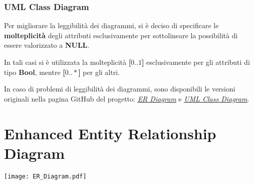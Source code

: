 \subsubsection{UML Class Diagram}

Per migliorare la leggibilità dei diagrammi, si è deciso di specificare le \textbf{molteplicità} degli attributi esclusivamente per sottolineare la possibilità di essere valorizzato a \textbf{NULL}. 

In tali casi si è utilizzata la molteplicità \textbf{[\(0..1\)]} esclusivamente per gli attributi di tipo \textbf{Bool}, mentre \textbf{[\(0..*\)]} per gli altri.

\bigskip

\begin{note}
  In caso di problemi di leggibilità dei diagrammi, sono disponibili le versioni originali nella pagina GitHub del progetto: \href{https://github.com/RiccardoElena/UninaDelivery/blob/develop/db/docs/sources/ER_Diagram.pdf}{\textit{\underline{ER Diagram}}} e \href{https://github.com/RiccardoElena/UninaDelivery/blob/develop/db/docs/sources/UML_Class_Diagram.pdf}{\textit{\underline{UML Class Diagram}}}.
\end{note}

\newpage
\section{Enhanced Entity Relationship Diagram}
\begin{center}
  \texttt{[image: ER\_Diagram.pdf]}
\end{center}

